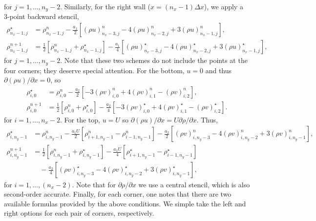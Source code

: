 \documentclass[11pt]{article}
\newcommand{\ind}[4]{{#1}^{#2}_{#3,#4}}
\begin{document}
for $j = 1,\hdots,n_y-2$. Similarly, for the right wall ($x = (n_x-1)\Delta x$), we apply a 3-point backward stencil,
\begin{align}
\ind{\rho}{\star}{n_x-1}{j} &= \ind{\rho}{n}{n_x-1}{j} 
- \frac{a_1}{2}\left[\ind{(\rho u)}{n}{n_x-3}{j} - 4\ind{(\rho u)}{n}{n_x-2}{j} + 3\ind{(\rho u)}{n}{n_x-1}{j}\right],\\
\ind{\rho}{n+1}{n_x-1}{j} &= \frac{1}{2}\left[ \ind{\rho}{n}{n_x-1}{j} + \ind{\rho}{\star}{n_x-1}{j} \right] 
- \frac{a_1}{4}\left[\ind{(\rho u)}{\star}{n_x-3}{j} - 4\ind{(\rho u)}{\star}{n_x-2}{j} + 3\ind{(\rho u)}{\star}{n_x-1}{j}\right],
\end{align}
for $j = 1,\hdots,n_y-2$. Note that these two schemes do not include the points at the four corners; they deserve special attention. For the bottom, $u = 0$ and thus $\partial(\rho u)/\partial x = 0$, so
\begin{align}
\ind{\rho}{\star}{i}{0} &= \ind{\rho}{n}{i}{0} - \frac{a_2}{2}\left[ -3\ind{(\rho v)}{n}{i}{0} + 4\ind{(\rho v)}{n}{i}{1} - \ind{(\rho v)}{n}{i}{2} \right],\\
\ind{\rho}{n+1}{i}{0} &= \frac{1}{2}\left[\ind{\rho}{n}{i}{0} + \ind{\rho}{\star}{i}{0}\right] - \frac{a_2}{4}\left[ -3\ind{(\rho v)}{\star}{i}{0} + 4\ind{(\rho v)}{\star}{i}{1} - \ind{(\rho v)}{\star}{i}{2} \right].
\end{align}
for $i = 1,\hdots,n_x-2$. For the top, $u = U$ so $\partial(\rho u)/\partial x = U\partial \rho/\partial x$. Thus,
\begin{align}
\ind{\rho}{\star}{i}{n_y-1} &= \ind{\rho}{n}{i}{n_y-1} - \frac{a_1 U}{2}\left[\ind{\rho}{n}{i+1}{n_y-1} - \ind{\rho}{n}{i-1}{n_y-1}\right] - \frac{a_2}{2}\left[ \ind{(\rho v)}{n}{i}{n_y - 3} - 4\ind{(\rho v)}{n}{i}{n_y - 2} + 3\ind{(\rho v)}{n}{i}{n_y-1} \right],\\
\ind{\rho}{n+1}{i}{n_y-1} &= \frac{1}{2}\left[\ind{\rho}{n}{i}{n_y-1} + \ind{\rho}{\star}{i}{n_y-1} \right] - \frac{a_1 U}{4}\left[\ind{\rho}{\star}{i+1}{n_y-1} - \ind{\rho}{\star}{i-1}{n_y-1}\right]\\
&\quad- \frac{a_2}{4}\left[ \ind{(\rho v)}{\star}{i}{n_y - 3} - 4\ind{(\rho v)}{\star}{i}{n_y - 2} + 3\ind{(\rho v)}{\star}{i}{n_y-1} \right],
\end{align}
for $i = 1,\hdots,(n_x-2)$. Note that for $\partial\rho/\partial x$ we use a central stencil, which is also second-order accurate. Finally, for each corner, one notes that there are two available formulas provided by the above conditions.
We simple take the left and right options for each pair of corners, respectively.
\end{document}
